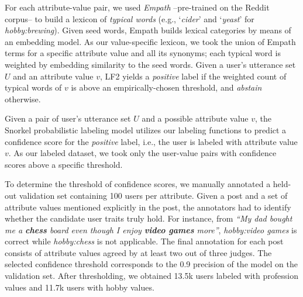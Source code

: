 \begin{table}[t!]
\caption{Positive and negative patterns used in the labeling function LF1 of the Snorkel labeling model. Each pattern must be followed by possible attribute values within a context window of 2 terms.}
\label{tab:patterns}
\end{table}


 For each attribute-value pair, we used \textit{Empath} \cite{fast2016empath} --pre-trained on the Reddit corpus-- to build a lexicon of \emph{typical words} (e.g., `\textit{cider}' and `\textit{yeast}' for \emph{hobby:brewing}). Given seed words, Empath builds lexical categories by means of an embedding model. As our value-specific lexicon, we took the union of Empath terms for a specific attribute value and all its synonyms; each typical word is weighted by embedding similarity to the seed words. 
Given a user's utterance set $U$ and an attribute value $v$, LF2 yields a \emph{positive} label if the weighted count of typical words of $v$ is above an empirically-chosen threshold, and \emph{abstain} otherwise.

\vspace{5pt}
Given a pair of user's utterance set $U$ and a possible attribute value $v$, the Snorkel probabilistic labeling model utilizes our labeling functions to
predict a confidence score for the \emph{positive} label, i.e., the user is labeled with attribute value $v$.
As our labeled dataset, we took only the user-value pairs with confidence scores above a specific threshold. 

To determine the threshold of confidence scores, we manually annotated a held-out validation set containing 100 users per attribute. 
Given a post and a set of attribute values mentioned explicitly in the post, the annotators had to identify whether the candidate user traits truly hold. For instance, from \emph{``My dad bought me a \textbf{chess} board even though I enjoy \textbf{video games} more''}, \emph{hobby:video games} is correct while \emph{hobby:chess} is not applicable.
The final annotation for each post consists of attribute values agreed by at least two out of three judges. The selected confidence threshold corresponds to the 0.9 precision of the model on the validation set. After thresholding, we obtained 13.5k users labeled with profession values and 11.7k users with hobby values.

